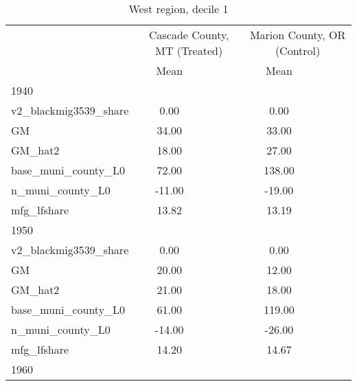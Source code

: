 \begin{table}[htbp]\centering
\def\sym#1{\ifmmode^{#1}\else\(^{#1}\)\fi}
\caption{West region, decile 1 \label{tab1}}
\begin{tabular}{l*{2}{ccc}}
\toprule
                    &\multicolumn{3}{c}{Cascade County, MT (Treated)}&\multicolumn{3}{c}{Marion County, OR (Control)}\\
                    &        Mean&            &            &        Mean&            &            \\
\midrule
1940                &            &            &            &            &            &            \\
v2\_blackmig3539\_share&        0.00&            &            &        0.00&            &            \\
GM                  &       34.00&            &            &       33.00&            &            \\
GM\_hat2             &       18.00&            &            &       27.00&            &            \\
base\_muni\_county\_L0 &       72.00&            &            &      138.00&            &            \\
n\_muni\_county\_L0    &      -11.00&            &            &      -19.00&            &            \\
mfg\_lfshare         &       13.82&            &            &       13.19&            &            \\
\midrule
1950                &            &            &            &            &            &            \\
v2\_blackmig3539\_share&        0.00&            &            &        0.00&            &            \\
GM                  &       20.00&            &            &       12.00&            &            \\
GM\_hat2             &       21.00&            &            &       18.00&            &            \\
base\_muni\_county\_L0 &       61.00&            &            &      119.00&            &            \\
n\_muni\_county\_L0    &      -14.00&            &            &      -26.00&            &            \\
mfg\_lfshare         &       14.20&            &            &       14.67&            &            \\
\midrule
1960                &            &            &            &            &            &            \\

\end{tabular}
\end{table}

